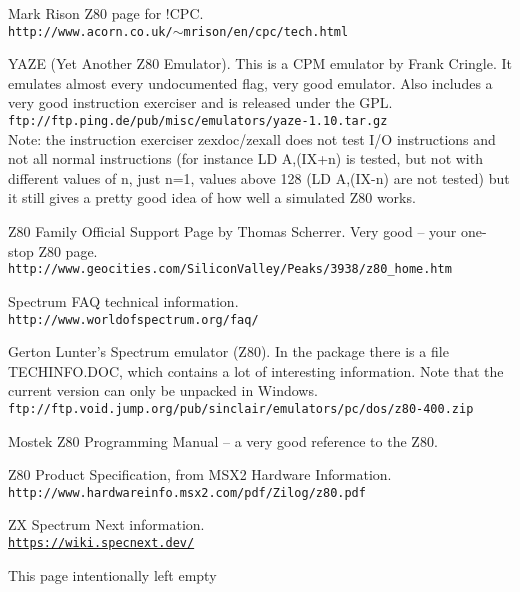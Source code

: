 \documentclass[12pt,twoside,openright,a4paper]{book}
\newcommand{\intentiallyempty}{
	\mbox{}
	\vfill
	\begin{center}
	This page intentionally left empty
	\end{center}
	\vfill
	\mbox{}
}
\begin{document}
\begin{thebibliography}{}

	  Mark Rison Z80 page for !CPC. \\
	{\tt \small http://www.acorn.co.uk/$\sim$mrison/en/cpc/tech.html}

	 YAZE (Yet Another Z80 Emulator). This is a CPM emulator by Frank Cringle. It emulates almost every undocumented flag, very good emulator. Also includes a very good instruction exerciser and is released under the GPL. \\
	{\tt \small ftp://ftp.ping.de/pub/misc/emulators/yaze-1.10.tar.gz} \\
	Note: the instruction exerciser zexdoc/zexall does not test I/O instructions and not all normal instructions (for instance LD A,(IX+n) is tested, but not with different values of n, just n=1, values above 128 (LD A,(IX-n) are not tested) but it still gives a pretty good idea of how well a simulated Z80 works.

	 Z80 Family Official Support Page by Thomas Scherrer. Very good -- your one-stop Z80 page. \\
	{\tt \small http://www.geocities.com/SiliconValley/Peaks/3938/z80\_home.htm}

	 Spectrum FAQ technical information. \\
	{\tt \small http://www.worldofspectrum.org/faq/}

	 Gerton Lunter's Spectrum emulator (Z80). In the package there is a file TECHINFO.DOC, which contains a lot of interesting information. Note that the current version can only be unpacked in Windows. \\
	{\tt \small ftp://ftp.void.jump.org/pub/sinclair/emulators/pc/dos/z80-400.zip}

	 Mostek Z80 Programming Manual -- a very good reference to the Z80.

	 Z80 Product Specification, from MSX2 Hardware Information. \\
	{\tt \small http://www.hardwareinfo.msx2.com/pdf/Zilog/z80.pdf}

	 ZX Spectrum Next information. \\
	{\tt \small \url{https://wiki.specnext.dev/}}

\end{thebibliography}



\pagebreak
\intentiallyempty
\pagebreak
\end{document}
